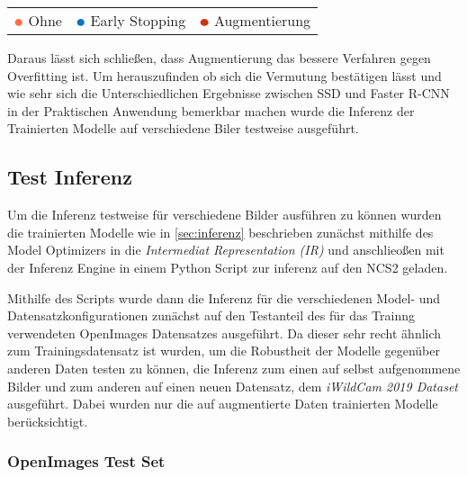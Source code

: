 \begin{table}[htb]
  \centering
  \begin{tabular}{m{}<{\centering}m{}<{\centering}m{}<{\centering}}
    $\color[HTML]{FF7043}\medbullet$  Ohne & $\color[HTML]{0077BB}\medbullet$  Early Stopping & $\color[HTML]{CC3311}\medbullet$  Augmentierung
  \end{tabular}    
\end{table}


Daraus lässt sich schließen, dass Augmentierung das 
bessere Verfahren gegen Overfitting ist. Um herauszufinden 
ob sich die Vermutung bestätigen lässt und wie sehr sich 
die Unterschiedlichen Ergebnisse zwischen SSD und 
Faster R-CNN in der Praktischen Anwendung bemerkbar 
machen wurde die Inferenz der Trainierten Modelle auf 
verschiedene Biler testweise ausgeführt.




\subsection{Test Inferenz}\label{sec:test_inferenz}

Um die Inferenz testweise für verschiedene Bilder ausführen zu 
können wurden die trainierten Modelle wie in \ref{sec:inferenz}
beschrieben zunächst mithilfe des Model Optimizers in die 
\textit{Intermediat Representation (IR)} und anschlieoßen 
mit der Inferenz Engine in einem Python Script zur 
inferenz auf den NCS2 geladen.

Mithilfe des Scripts wurde dann die Inferenz für die 
verschiedenen Model- und Datensatzkonfigurationen
zunächst auf den Testanteil des für das Trainng verwendeten 
OpenImages Datensatzes ausgeführt.
Da dieser sehr recht ähnlich zum Trainingsdatensatz ist 
wurden, um die Robustheit der Modelle gegenüber anderen 
Daten testen zu können, die Inferenz zum einen auf selbst
aufgenommene Bilder und zum anderen auf einen neuen Datensatz,
dem \textit{iWildCam 2019 Dataset} \cite{beery2019iwildcam}
ausgeführt. Dabei wurden nur die auf augmentierte Daten trainierten 
Modelle berücksichtigt. 




\subsubsection{OpenImages Test Set}

